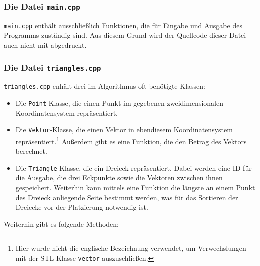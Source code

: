 \documentclass[a4paper, notitlepage, 12pt]{scrartcl}
\begin{document}
\subsubsection{Die Datei \texttt{main.cpp}}
\texttt{main.cpp} enthält ausschließlich Funktionen, die für Eingabe und Ausgabe des Programms zuständig sind. Aus diesem Grund wird der Quellcode dieser Datei auch nicht mit abgedruckt.
\subsubsection{Die Datei \texttt{triangles.cpp}}
\texttt{triangles.cpp} enhält drei im Algorithmus oft benötigte Klassen:
\begin{itemize}
	\item Die \texttt{Point}-Klasse, die einen Punkt im gegebenen zweidimensionalen Koordinatensystem repräsentiert.
	\item Die \texttt{Vektor}-Klasse, die einen Vektor in ebendiesem Koordinatensystem repräsentiert.\footnote{Hier wurde nicht die englische Bezeichnung verwendet, um Verwechslungen mit der STL-Klasse \texttt{vector} auszuschließen.} Außerdem gibt es eine Funktion, die den Betrag des Vektors berechnet.
	\item Die \texttt{Triangle}-Klasse, die ein Dreieck repräsentiert. Dabei werden eine ID für die Ausgabe, die drei Eckpunkte sowie die Vektoren zwischen ihnen gespeichert. Weiterhin kann mittels eine Funktion die längste an einem Punkt des Dreieck anliegende Seite bestimmt werden, was für das Sortieren der Dreiecke vor der Platzierung notwendig ist.
\end{itemize}
Weiterhin gibt es folgende Methoden:
\end{document}
